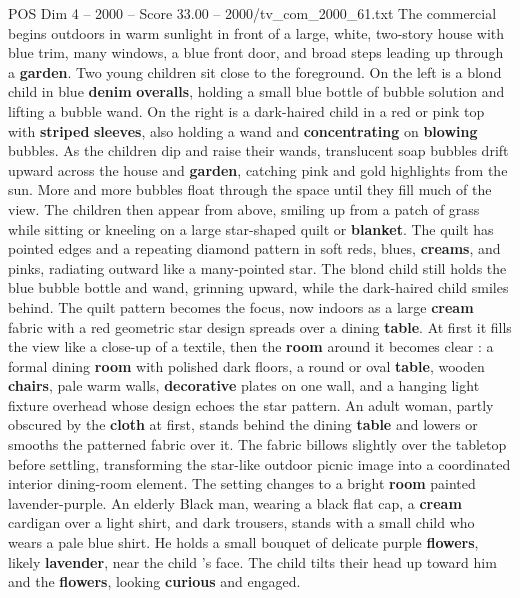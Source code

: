\begin{textsample}{POS Dim 4 – 2000 – Score 33.00 – 2000/tv\_com\_2000\_61.txt}  \label{ex:f4_pos_051}
The commercial begins outdoors in warm sunlight in front of a large, white, two-story house with blue trim, many windows, a blue front door, and broad steps leading up through a \textbf{garden}.
Two young children sit close to the foreground.
On the left is a blond child in blue \textbf{denim} \textbf{overalls}, holding a small blue bottle of bubble solution and lifting a bubble wand.
On the right is a dark-haired child in a red or pink top with \textbf{striped} \textbf{sleeves}, also holding a wand and \textbf{concentrating} on \textbf{blowing} bubbles.
As the children dip and raise their wands, translucent soap bubbles drift upward across the house and \textbf{garden}, catching pink and gold highlights from the sun.
More and more bubbles float through the space until they fill much of the view.
The children then appear from above, smiling up from a patch of grass while sitting or kneeling on a large star-shaped quilt or \textbf{blanket}.
The quilt has pointed edges and a repeating diamond pattern in soft reds, blues, \textbf{creams}, and pinks, radiating outward like a many-pointed star.
The blond child still holds the blue bubble bottle and wand, grinning upward, while the dark-haired child smiles behind.
The quilt pattern becomes the focus, now indoors as a large \textbf{cream} fabric with a red geometric star design spreads over a dining \textbf{table}.
At first it fills the view like a close-up of a textile, then the \textbf{room} around it becomes clear : a formal dining \textbf{room} with polished dark floors, a round or oval \textbf{table}, wooden \textbf{chairs}, pale warm walls, \textbf{decorative} plates on one wall, and a hanging light fixture overhead whose design echoes the star pattern.
An adult woman, partly obscured by the \textbf{cloth} at first, stands behind the dining \textbf{table} and lowers or smooths the patterned fabric over it.
The fabric billows slightly over the tabletop before settling, transforming the star-like outdoor picnic image into a coordinated interior dining-room element.
The setting changes to a bright \textbf{room} painted lavender-purple.
An elderly Black man, wearing a black flat cap, a \textbf{cream} cardigan over a light shirt, and dark trousers, stands with a small child who wears a pale blue shirt.
He holds a small bouquet of delicate purple \textbf{flowers}, likely \textbf{lavender}, near the child ’s face.
The child tilts their head up toward him and the \textbf{flowers}, looking \textbf{curious} and engaged.

\end{textsample}
